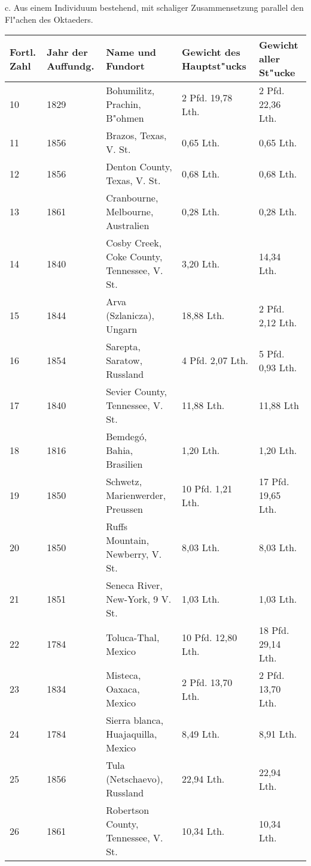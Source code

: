 \documentclass[a4paper, 11pt, oneside]{article}
\begin{document}
\clearpage
\begin{center}
c. Aus einem Individuum bestehend, mit schaliger Zusammensetzung parallel den Fl"achen des Oktaeders.
\end{center}
\begin{center}
\begin{footnotesize}
\begin{tabular}{ |p{7mm}|p{9mm}|p{45mm}|p{24mm}|p{24mm}| }
    \hline
    Fortl. Zahl & Jahr der Auffundg. & Name und Fundort & Gewicht des Hauptst"ucks & Gewicht aller St"ucke\\
    \hline\hline
    10 & 1829 & Bohumilitz, Prachin, B"ohmen & 2 Pfd. 19,78 Lth. & 2 Pfd. 22,36 Lth.\\\hline
    11 & 1856 & Brazos, Texas, V. St. & 0,65 Lth. & 0,65 Lth.\\\hline
    12 & 1856 & Denton County, Texas, V. St. & 0,68 Lth. & 0,68 Lth.\\\hline
    13 & 1861 & Cranbourne, Melbourne, Australien & 0,28 Lth. & 0,28 Lth.\\\hline
    14 & 1840 & Cosby Creek, Coke County, Tennessee, V. St. & 3,20 Lth. & 14,34 Lth.\\\hline
    15 & 1844 & Arva (Szlanicza), Ungarn & 18,88 Lth. & 2 Pfd. 2,12 Lth.\\\hline
    16 & 1854 & Sarepta, Saratow, Russland & 4 Pfd. 2,07 Lth. & 5 Pfd. 0,93 Lth.\\\hline
    17 & 1840 & Sevier County, Tennessee, V. St. & 11,88 Lth. & 11,88 Lth\\\hline
    18 & 1816 & Bemdegó, Bahia, Brasilien & 1,20 Lth. & 1,20 Lth.\\\hline
    19 & 1850 & Schwetz, Marienwerder, Preussen & 10 Pfd. 1,21 Lth. & 17 Pfd. 19,65 Lth.\\\hline
    20 & 1850 & Ruffs Mountain, Newberry, V. St. & 8,03 Lth. & 8,03 Lth.\\\hline
    21 & 1851 & Seneca River, New-York, 9 V. St. & 1,03 Lth. & 1,03 Lth.\\\hline
    22 & 1784 & Toluca-Thal, Mexico & 10 Pfd. 12,80 Lth. & 18 Pfd. 29,14 Lth.\\\hline
    23 & 1834 & Misteca, Oaxaca, Mexico & 2 Pfd. 13,70 Lth. & 2 Pfd. 13,70 Lth.\\\hline
    24 & 1784 & Sierra blanca, Huajaquilla, Mexico & 8,49 Lth. & 8,91 Lth.\\\hline
    25 & 1856 & Tula (Netschaevo), Russland & 22,94 Lth. & 22,94 Lth.\\\hline
    26 & 1861 & Robertson County, Tennessee, V. St. & 10,34 Lth. & 10,34 Lth.\\\hline

\end{tabular}
\end{footnotesize}
\end{center}
\end{document}
